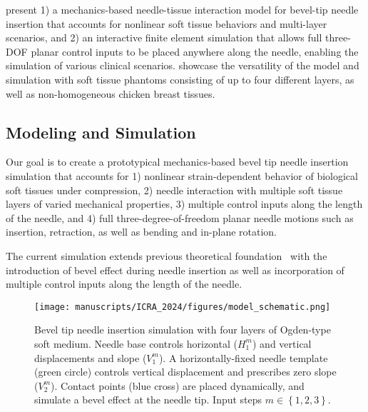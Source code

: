  present 1) a mechanics-based needle-tissue interaction model for bevel-tip needle insertion that accounts for nonlinear soft tissue behaviors and multi-layer scenarios, and 2) an interactive finite element simulation that allows full three-DOF planar control inputs to be placed anywhere along the needle, enabling the simulation of various clinical scenarios.  showcase the versatility of the model and simulation with soft tissue phantoms consisting of up to four different layers, as well as non-homogeneous chicken breast tissues.

\subsection{Modeling and Simulation}
\label{sec:chap-4-modeling-and-simulation}

Our goal is to create a prototypical mechanics-based bevel tip needle insertion simulation that accounts for 1) nonlinear strain-dependent behavior of biological soft tissues under compression, 2) needle interaction with multiple soft tissue layers of varied mechanical properties, 3) multiple control inputs along the length of the needle, and 4) full three-degree-of-freedom planar needle motions such as insertion, retraction, as well as bending and in-plane rotation.

The current simulation extends previous theoretical foundation~\parencite{wangFlexibleNeedleBending2023} with the introduction of bevel effect during needle insertion as well as incorporation of multiple control inputs along the length of the needle.

\begin{figure}[ht]
  \centering
  \texttt{[image: manuscripts/ICRA\_2024/figures/model\_schematic.png]}
  \caption{Bevel tip needle insertion simulation with four layers of Ogden-type soft medium. Needle base controls horizontal ($H_1^m$) and vertical displacements and slope ($V_1^m$). A horizontally-fixed needle template (green circle) controls vertical displacement and prescribes zero slope ($V_2^m$). Contact points (blue cross) are placed dynamically, and simulate a bevel effect at the needle tip. Input steps $m\in \left\{ 1, 2, 3 \right\}$.}
  \label{fig:chap-4-model-schematic}
\end{figure}

